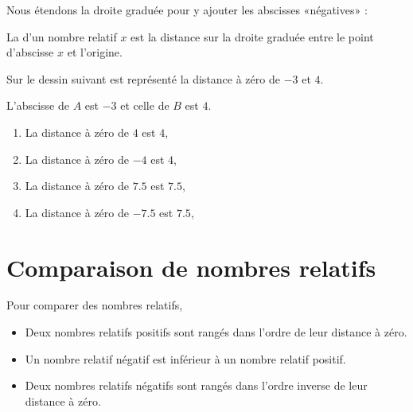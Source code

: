 

\vspace{3cm}

Nous étendons la droite graduée pour y ajouter les abscisses «négatives» :
\begin{center}
    
\end{center}

\begin{definition}
    La  d'un nombre relatif \( x\) est la distance sur la droite graduée entre le point d'abscisse \( x\) et l'origine.
\end{definition}

\begin{example}
    Sur le dessin suivant est représenté la distance à zéro de \( -3\) et \( 4\).
    \begin{center}
        
    \end{center}
    L'abscisse de \( A\) est \( -3\) et celle de \( B\) est \( 4\).
\end{example}

\begin{example}
    \begin{enumerate}
        \item
            La distance à zéro de \( 4\) est \( 4\),
        \item
            La distance à zéro de \( -4\) est \( 4\),
        \item
            La distance à zéro de \( 7.5\) est \( 7.5\),
        \item
            La distance à zéro de \( -7.5 \) est \( 7.5\),
    \end{enumerate}
\end{example}

\section{Comparaison de nombres relatifs}



\begin{Aretenir}
    
    Pour comparer des nombres relatifs,

    \begin{itemize}
        \item 
Deux nombres relatifs positifs sont rangés dans l'ordre de leur distance à zéro.  
\item
Un nombre relatif négatif est inférieur à un nombre relatif positif. 
\item
Deux nombres relatifs négatifs sont rangés dans l'ordre inverse de leur distance à zéro.
    \end{itemize}
\end{Aretenir}

